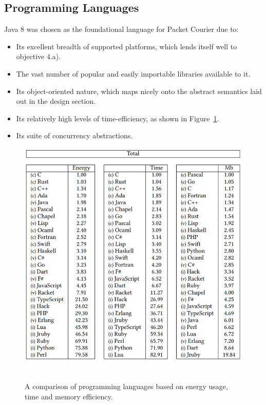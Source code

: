 \newpage

\subsection{Programming Languages}

Java 8\cite{java_8} was chosen as the foundational language for Packet Courier due to:
\begin{itemize}
    \item Its excellent breadth of supported platforms\cite{java_8_support}, which lends itself well to objective 4.a).
    \item The vast number of popular and easily importable libraries available to it\cite{java_relevance}.
    \item Its object-oriented nature, which maps nicely onto the abstract semantics laid out in the design section.
    \item Its relatively high levels of time-efficiency, as shown in
    Figure~\ref{fig:chapter_4_implementation-programming_language_comparison}.
    \item Its suite of concurrency abstractions\cite{java_util_concurrent}.
\end{itemize}

\begin{figure}[!h]
    \includegraphics[width=\textwidth]{images/chapter_4_implementation/programming_language_comparison}
    \centering~\caption{A comparison of programming languages based on energy usage, time and memory
    efficiency\cite{programming_language_efficiency}.}
    \label{fig:chapter_4_implementation-programming_language_comparison}
\end{figure}

